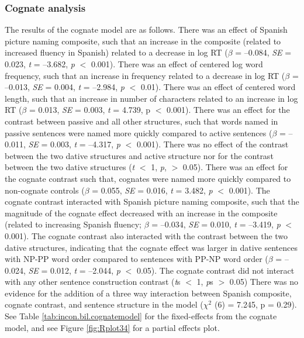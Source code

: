 \subsubsection{Cognate analysis}
\label{cognateanalysis}

The results of the cognate model are as follows. There was an effect of Spanish picture naming composite, such that an increase in the composite (related to increased fluency in Spanish) related to a decrease in log RT (\emph{$\beta$} = --0.084, \emph{SE} = 0.023, \emph{t} = --3.682, \emph{p} $<$ 0.001). There was an effect of centered log word frequency, such that an increase in frequency related to a decrease in log RT (\emph{$\beta$} = --0.013, \emph{SE} = 0.004, \emph{t} = --2.984, \emph{p} $<$ 0.01). There was an effect of centered word length, such that an increase in number of characters related to an increase in log RT ($\beta$ = 0.013, \emph{SE} = 0.003, \emph{t} = 4.739, p $<$ 0.001). There was an effect for the contrast between passive and all other structures, such that words named in passive sentences were named more quickly compared to active sentences (\emph{$\beta$} = --0.011, \emph{SE} = 0.003, \emph{t} = --4.317, \emph{p} $<$ 0.001). There was no effect of the contrast between the two dative structures and active structure nor for the contrast between the two dative structures (\emph{t} $<$ 1, \emph{p}, $>$ 0.05). There was an effect for the cognate contrast such that, cognates were named more quickly compared to non-cognate controls (\emph{$\beta$} = 0.055, \emph{SE} = 0.016, \emph{t} = 3.482, \emph{p} $<$ 0.001). The cognate contrast interacted with Spanish picture naming composite, such that the magnitude of the cognate effect decreased with an increase in the composite (related to increasing Spanish fluency; \emph{$\beta$} = --0.034, \emph{SE} = 0.010, \emph{t} = --3.419, \emph{p} $<$ 0.001). The cognate contrast also interacted with the contrast between the two dative structures, indicating that the cognate effect was larger in dative sentences with NP-PP word order compared to sentences with PP-NP word order (\emph{$\beta$} = --0.024, \emph{SE} = 0.012, \emph{t} = --2.044, \emph{p} $<$ 0.05). The cognate contrast did not interact with any other sentence construction contrast (\emph{t}s $<$ 1, \emph{p}s $>$ 0.05) There was no evidence for the addition of a three way interaction between Spanish composite, cognate contrast, and sentence structure in the model ($\chi^2$ (6) = 7.245, p = 0.29). See Table \ref{tab:incon.bil.cognatemodel} for the fixed-effects from the cognate model, and see Figure \ref{fig:Rplot34} for a partial effects plot. 


